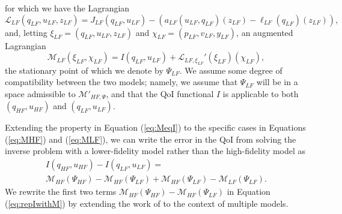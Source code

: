 for which we have the Lagrangian
\begin{equation}
\mathcal{L}_{LF}(q_{LF},u_{LF},z_{LF})= J_{LF}(q_{LF},u_{LF})-(a_{LF}(u_{LF},q_{LF})(z_{LF})-\ell_{LF}(q_{LF})(z_{LF})),
\end{equation}
and, letting $\xi_{LF}=(q_{LF},u_{LF},z_{LF})$ and $\chi_{LF}=(p_{LF},v_{LF},y_{LF})$, an augmented Lagrangian
\begin{equation}
\mathcal{M}_{LF}(\xi_{LF},\chi_{LF}) = I(q_{LF},u_{LF}) + \mathcal{L}_{LF,\xi_{LF}}'(\xi_{LF})(\chi_{LF}),
\label{eq:MLF}
\end{equation}
the stationary point of which we denote by $\Psi_{LF}$. We assume some degree of compatibility between the two models; namely, we assume that $\Psi_{LF}$ will be in a space admissible to $\mathcal{M}'_{HF,\Psi}$, and that the QoI functional $I$ is applicable to both $(q_{HF},u_{HF})$ and $(q_{LF},u_{LF})$.

Extending the property in Equation (\ref{eq:MeqI}) to the specific cases in Equations (\ref{eq:MHF}) and (\ref{eq:MLF}), we can write the error in the QoI from solving the inverse problem with a lower-fidelity model rather than the high-fidelity model as
\begin{multline}
I(q_{HF},u_{HF})-I(q_{LF},u_{LF})=\\\mathcal{M}_{HF}(\Psi_{HF})-\mathcal{M}_{HF}(\Psi_{LF})+\mathcal{M}_{HF}(\Psi_{LF})-\mathcal{M}_{LF}(\Psi_{LF})\textrm{.}
\label{eq:repIwithM}
\end{multline}
We rewrite the first two terms $\mathcal{M}_{HF}(\Psi_{HF})-\mathcal{M}_{HF}(\Psi_{LF})$ in Equation (\ref{eq:repIwithM}) by extending the work of \cite{BecVex05} to the context of multiple models.

